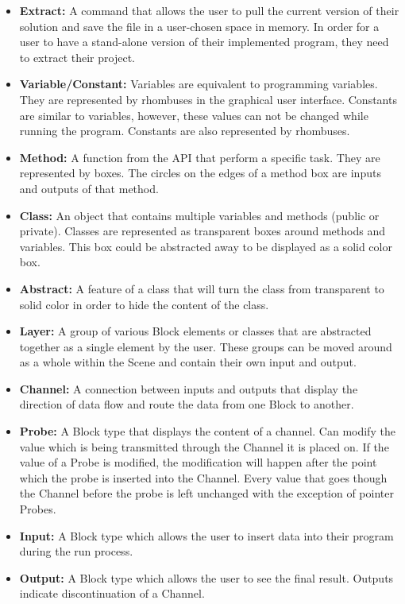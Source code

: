 \documentclass[journal,10pt,onecolumn,compsoc]{IEEEtran} \usepackage[margin=1.0in]{geometry} \usepackage{pdfpages}
\begin{document}
\begin{itemize}
	\item \textbf{Extract:}
		A command that allows the user to pull the current version of their solution and save the file in a user-chosen space in memory.
		In order for a user to have a stand-alone version of their implemented program, they need to extract their project.\\
	\item \textbf{Variable/Constant:}
		Variables are equivalent to programming variables. They are represented by rhombuses in the graphical user interface.
		Constants are similar to  variables, however, these values can not be changed while running the program.
		Constants are also represented by rhombuses.\\
	\item \textbf{Method:}
		A function from the API that perform a specific task. They are represented by boxes.
		The circles on the edges of a method box are inputs and outputs of that method.\\
	\item \textbf{Class:} 
		An object that contains multiple variables and methods (public or private).
		Classes are represented as transparent boxes around methods and variables. This box could be abstracted away to be displayed as a solid color box.\\
	\item \textbf{Abstract:}
		A feature of a class that will turn the class from transparent to solid color in order to hide the content of the class.\\
	\item \textbf{Layer:} 
		A group of various Block elements or classes that are abstracted together as a single element by the user.
		These groups can be moved around as a whole within the Scene and contain their own input and output.\\
	\item \textbf{Channel:}
		 A connection between inputs and outputs that display the direction of data flow and route the data from one Block to another.\\
	\item \textbf{Probe:}
		A Block type that displays the content of a channel.
		Can modify the value which is being transmitted through the Channel it is placed on.
		If the value of a Probe is modified, the modification will happen after the point which the probe is inserted into the Channel.
		Every value that goes though the Channel before the probe is left unchanged with the exception of pointer Probes.\\
	\item \textbf{Input:}
		A Block type which allows the user to insert data into their program during the run process.\\
	\item \textbf{Output:}
		A Block type which allows the user to see the final result. Outputs indicate discontinuation of a Channel.\\
\end{itemize}
\newpage
\end{document}
